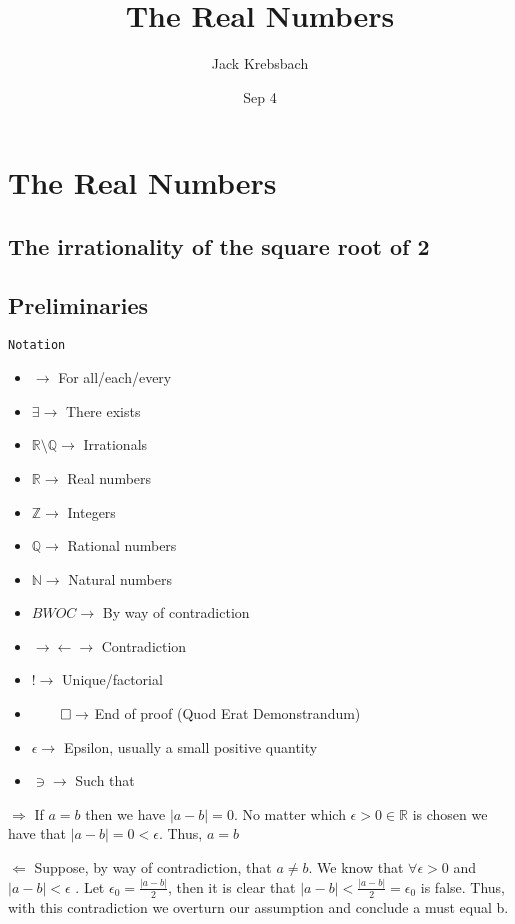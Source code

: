 \documentclass{report}
\title{The Real Numbers}
\author{Jack Krebsbach }
\date{Sep 4}
\begin{document}
\maketitle

\section{The Real Numbers}

\subsection{The irrationality of the square root of 2 }

\subsection{Preliminaries}

\texttt{Notation}
\begin{multicols}{2}
\begin{itemize}
  \item $ \rightarrow$ For all/each/every
  \item $\exists \rightarrow$ There exists
  \item $\mathbb{R} \setminus \mathbb{Q} \rightarrow$ Irrationals
  \item $\mathbb{R} \rightarrow$ Real numbers
  \item $\mathbb{Z} \rightarrow$ Integers
  \item $\mathbb{Q} \rightarrow$ Rational numbers
  \item $\mathbb{N} \rightarrow$ Natural numbers
  \item $BWOC \rightarrow$ By way of contradiction
  \item $\rightarrow\!\leftarrow \rightarrow$ Contradiction
  \item $! \rightarrow$ Unique/factorial
  \item $\qed \rightarrow$ End of proof (Quod Erat Demonstrandum)
  \item $\epsilon \rightarrow$ Epsilon, usually a small positive quantity
  \item $\ni \rightarrow$ Such that
\end{itemize}
\end{multicols}


\begin{myproof}

  \par
  $\Rightarrow$
  If $a=b$ then we have $|a-b| =0$. No matter which  $\epsilon >  0 \in \mathbb{R}$ is chosen we have that  $|a-b|=0 < \epsilon.$ Thus, $a=b$  \par
$\Leftarrow$
Suppose, by way of contradiction, that $a\neq b$. We know that $\forall \epsilon > 0$ and $|a-b| < \epsilon$ . Let $\epsilon_{0} = \frac{|a-b|}{2}$, then it is clear that $|a-b| < \frac{|a-b|}{2} = \epsilon_{0}$ is false. Thus, with this contradiction we overturn our assumption and conclude a must equal b.
\end{myproof}
\end{document}
